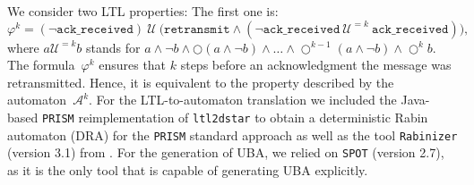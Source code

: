 \documentclass{elsarticle}
\def\cA{\mathcal{A}}
\def\cU{\mathcal{U}}
\newcommand{\until}{\cU}
\newcommand{\neXt}{\bigcirc}
\newcommand{\prism}{\texttt{PRISM}}
\newcommand{\spot}{\texttt{SPOT}}
\newcommand{\ltltodstar}{\texttt{ltl2dstar}}
\newcommand{\rabinizer}{\texttt{Rabinizer}}
\begin{document}
We consider two LTL properties: The first one is:
\[\varphi^k = (\neg \texttt{ack\_received}) \ \until \ \bigl(\texttt{retransmit} \wedge (\neg \texttt{ack\_received} \ \until^{= k}\ \texttt{ack\_received})\bigr),\]
where \(a \until^{=k} b\) stands for \(a \wedge \neg b \wedge \neXt (a \wedge
\neg b) \wedge \ldots \wedge \neXt^{k-1} (a \wedge \neg b) \wedge \neXt^k b\).
The formula~\(\varphi^k\)
ensures that $k$ steps before an acknowledgment the message was retransmitted.
Hence, it is equivalent to the property described by the automaton~\(\cA^k\).
For the LTL-to-automaton translation we
included the Java-based \prism{} reimplementation of \ltltodstar{}
\cite{KB06} to obtain a deterministic Rabin automaton (DRA) for the \prism{} standard approach as well as the tool \rabinizer{} (version 3.1) from \cite{EsparzaKS16}. For the
generation of UBA, we relied on \spot{} (version 2.7), as it is
the only tool that is capable of generating UBA explicitly. 
\end{document}
